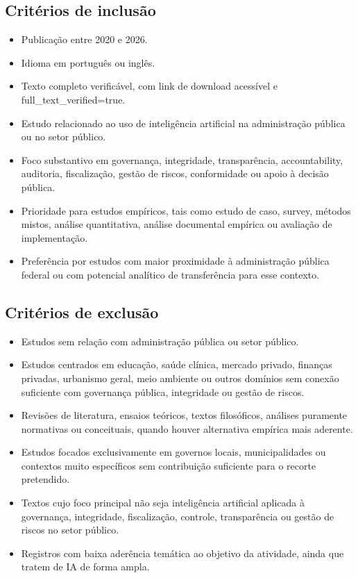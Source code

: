 \documentclass[12pt,a4paper]{article}
\begin{document}
\subsection{Critérios de inclusão}
\label{sec:orga846610}

\begin{itemize}
\item Publicação entre 2020 e 2026.
\item Idioma em português ou inglês.
\item Texto completo verificável, com link de download acessível e full\_text\_verified=true.
\item Estudo relacionado ao uso de inteligência artificial na administração pública ou no setor público.
\item Foco substantivo em governança, integridade, transparência, accountability, auditoria, fiscalização, gestão de riscos, conformidade ou apoio à decisão pública.
\item Prioridade para estudos empíricos, tais como estudo de caso, survey, métodos mistos, análise quantitativa, análise documental empírica ou avaliação de implementação.
\item Preferência por estudos com maior proximidade à administração pública federal ou com potencial analítico de transferência para esse contexto.
\end{itemize}

\subsection{Critérios de exclusão}
\label{sec:orgf3dd611}

\begin{itemize}
\item Estudos sem relação com administração pública ou setor público.
\item Estudos centrados em educação, saúde clínica, mercado privado, finanças privadas, urbanismo geral, meio ambiente ou outros domínios sem conexão suficiente com governança pública, integridade ou gestão de riscos.
\item Revisões de literatura, ensaios teóricos, textos filosóficos, análises puramente normativas ou conceituais, quando houver alternativa empírica mais aderente.
\item Estudos focados exclusivamente em governos locais, municipalidades ou contextos muito específicos sem contribuição suficiente para o recorte pretendido.
\item Textos cujo foco principal não seja inteligência artificial aplicada à governança, integridade, fiscalização, controle, transparência ou gestão de riscos no setor público.
\item Registros com baixa aderência temática ao objetivo da atividade, ainda que tratem de IA de forma ampla.
\end{itemize}
\end{document}
